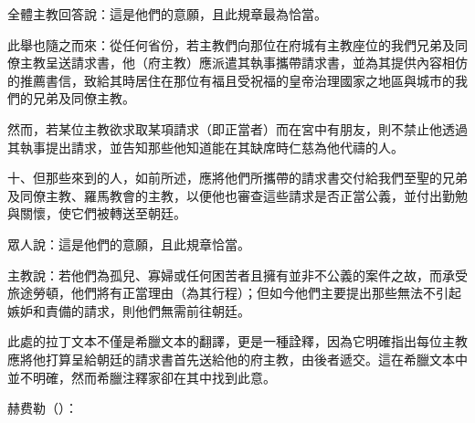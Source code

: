 全體主教回答說：這是他們的意願，且此規章最為恰當。\par

此舉也隨之而來：從任何省份，若主教們向那位在府城有主教座位的我們兄弟及同僚主教呈送請求書，他（府主教）應派遣其執事攜帶請求書，並為其提供內容相仿的推薦書信，致給其時居住在那位有福且受祝福的皇帝治理國家之地區與城市的我們的兄弟及同僚主教。\par

然而，若某位主教欲求取某項請求（即正當者）而在宮中有朋友，則不禁止他透過其執事提出請求，並告知那些他知道能在其缺席時仁慈為他代禱的人。\par

十、但那些來到的人，如前所述，應將他們所攜帶的請求書交付給我們至聖的兄弟及同僚主教、羅馬教會的主教，以便他也審查這些請求是否正當公義，並付出勤勉與關懷，使它們被轉送至朝廷。\par

眾人說：這是他們的意願，且此規章恰當。\par

主教說：若他們為孤兒、寡婦或任何困苦者且擁有並非不公義的案件之故，而承受旅途勞頓，他們將有正當理由（為其行程）；但如今他們主要提出那些無法不引起嫉妒和責備的請求，則他們無需前往朝廷。\par

此處的拉丁文本不僅是希臘文本的翻譯，更是一種詮釋，因為它明確指出每位主教應將他打算呈給朝廷的請求書首先送給他的府主教，由後者遞交。這在希臘文本中並不明確，然而希臘注釋家卻在其中找到此意。\par

赫费勒（）：\par

